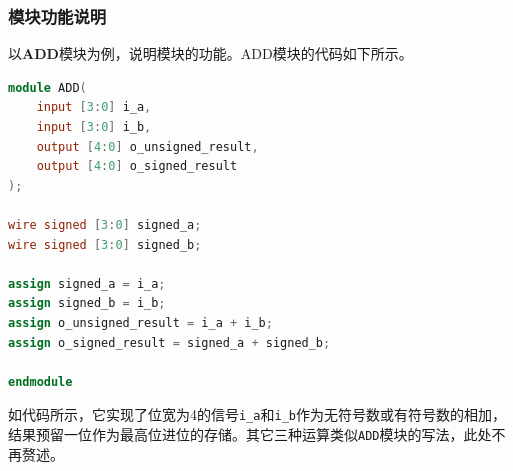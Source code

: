 \subsubsection{模块功能说明}
以\textbf{ADD}模块为例，说明模块的功能。ADD模块的代码如下所示。
\begin{lstlisting}[language=verilog]
  module ADD(
    input [3:0] i_a,
    input [3:0] i_b,
    output [4:0] o_unsigned_result,
    output [4:0] o_signed_result
);

wire signed [3:0] signed_a;
wire signed [3:0] signed_b;

assign signed_a = i_a;
assign signed_b = i_b;
assign o_unsigned_result = i_a + i_b;
assign o_signed_result = signed_a + signed_b;

endmodule
\end{lstlisting}

如代码所示，它实现了位宽为4的信号\texttt{i\_a}和\texttt{i\_b}作为无符号数或有符号数的相加，结果预留一位作为最高位进位的存储。其它三种运算类似\texttt{ADD}模块的写法，此处不再赘述。
